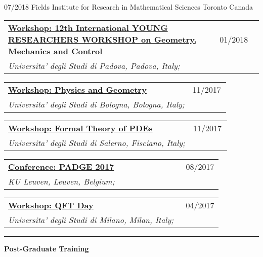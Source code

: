 \documentclass[a4paper]{article}
\newcommand{\block}[1]{\hrule \vspace{0.2cm} \textbf{\Large #1} \vspace{0.2cm}}
\newcommand{\longvoice}[8]{
	\begin{tabular}{p{0.83\linewidth} p{0.17\linewidth} }
		\textbf{\href{#3}{#2: #1}} & #4 
		\\ 
		\textit{#5, #6, #7;} & {\small\emph{#8}}
	\end{tabular}
	\vspace{.5em}
}
\begin{document}
		{07/2018}
		{Fields Institute for Research in Mathematical Sciences}
		{Toronto}
		{Canada}
		{}
	\longvoice{12th International YOUNG RESEARCHERS WORKSHOP on Geometry, Mechanics and Control}
		{Workshop}
		{http://events.math.unipd.it/12YRW/}
		{01/2018}
		{Universita' degli Studi di Padova}
		{Padova}
		{Italy}
		{}
	\longvoice{Physics and Geometry}
		{Workshop}
		{https://agenda.infn.it/conferenceDisplay.py?confId=14261}
		{11/2017}
		{Universita' degli Studi di Bologna}
		{Bologna}
		{Italy}
		{}
	\longvoice{Formal Theory of PDEs}
		{Workshop}
		{http://www.dipmat2.unisa.it/people/vitagliano/www/micro-workshop.html}
		{11/2017}
		{Universita' degli Studi di Salerno}
		{Fisciano}
		{Italy}
		{}
	\longvoice{PADGE 2017}
		{Conference}
		{https://web.archive.org/web/20170924130155/https://wis.kuleuven.be/events/padge2017}
		{08/2017}
		{KU Leuven}
		{Leuven}
		{Belgium}
		{}
	\longvoice{QFT Day}
		{Workshop}
		{https://web.archive.org/web/20170924130005/http://www.matematica.unimi.it/extfiles/unimidire/66001/attachment/qft-day-2017-1.pdf}
		{04/2017}
		{Universita' degli Studi di Milano}
		{Milan}
		{Italy}
		{}


	\block{Post-Graduate Training}
\end{document}

